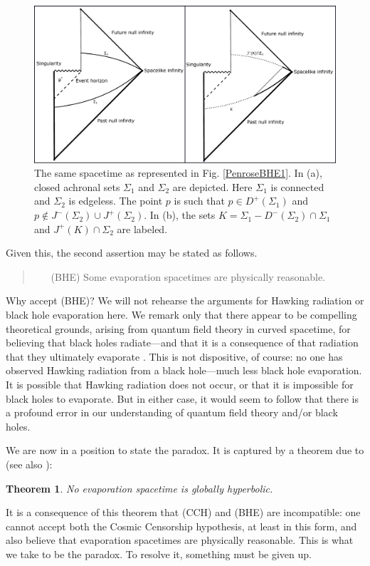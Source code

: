 \documentclass[authoryear,12pt,3p]{jowarticle}
\newtheorem{thm}{Theorem}
\begin{document}
\begin{figure}[h]    \centering
   \includegraphics[width=5in]{BHE_Penrose_Diagram2+3.pdf}
   \caption{\label{PenroseBHE2} The same spacetime as represented in Fig. \ref{PenroseBHE1}.  In (a), closed achronal sets $\Sigma_1$ and $\Sigma_2$ are depicted.  Here $\Sigma_1$ is connected and $\Sigma_2$ is edgeless.  The point $p$ is such that $p\in D^+(\Sigma_1)$ and $p\not\in J^-(\Sigma_2)\cup J^+(\Sigma_2)$.  In (b), the sets $K=\Sigma_1-D^-(\Sigma_2)\cap \Sigma_1$ and $J^+(K)\cap\Sigma_2$ are labeled.}
\end{figure}

Given this, the second assertion may be stated as follows.
\begin{quote}
\begin{itemize}
\item[(BHE)]\label{BHE} Some evaporation spacetimes are physically reasonable.
\end{itemize}
\end{quote}
Why accept (BHE)?  We will not rehearse the arguments for Hawking radiation or black hole evaporation here.  We remark only that there appear to be compelling theoretical grounds, arising from quantum field theory in curved spacetime, for believing that black holes radiate---and that it is a consequence of that radiation that they ultimately evaporate \citep{HawkingR1,HawkingR2,UnruhBHE,Birrell+Davies,Fulling,WaldQFTCST}.
This is not dispositive, of course: no one has observed Hawking radiation from a black hole---much less black hole evaporation.  It is possible that Hawking radiation does not occur, or that it is impossible for black holes to evaporate.  But in either case, it would seem to follow that there is a profound error in our understanding of quantum field theory and/or black holes.

We are now in a position to state the paradox.  It is captured by a theorem due to \citet{Kodama} (see also \citet{Wald1984}):
\begin{thm} No evaporation spacetime is globally hyperbolic.\end{thm}
It is a consequence of this theorem that (CCH) and (BHE) are incompatible: one cannot accept both the Cosmic Censorship hypothesis, at least in this form, and also believe that evaporation spacetimes are physically reasonable.  This is what we take to be the paradox.  To resolve it, something must be given up.
\end{document}
